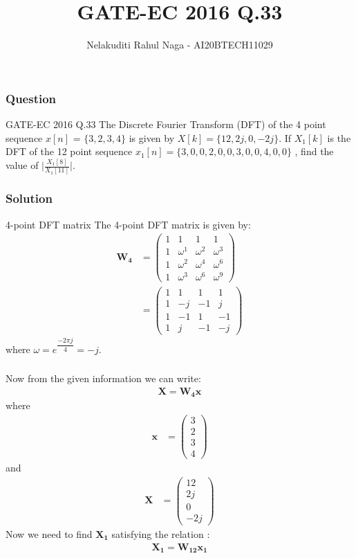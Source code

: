 \documentclass{beamer}
\title{GATE-EC 2016 Q.33}
\author{Nelakuditi Rahul Naga - AI20BTECH11029}
\newcommand{\myvec}[1]{\ensuremath{\begin{pmatrix}#1\end{pmatrix}}}
\renewcommand{\vec}[1]{\mathbf{#1}}
\begin{document}
\begin{frame}
\titlepage
\end{frame}

\begin{frame}
\frametitle{Question}
\begin{block}{GATE-EC 2016 Q.33}
The Discrete Fourier Transform (DFT) of the 4 point sequence $ x[n]$ = $\{3, 2, 3, 4\}$ is given by $ X[k] =\{12, 2j, 0, -2j\}$. If $X_{1}[k]$ is the DFT of the 12 point sequence $ x_{1}[n] =\{3, 0, 0, 2, 0, 0, 3, 0, 0, 4, 0, 0\}$ , find the value of $\big|{\frac{X_{1}[8]}{X_{1}[11]}}\big|$.
\end{block}
\end{frame}

\begin{frame}
\frametitle{Solution}
\begin{block}{4-point DFT matrix}
The 4-point DFT matrix is given by:
\begin{align}
\vec{W_{4}} &=\myvec{
 1  & 1 & 1 & 1 \\
 1 & \omega^1  &\omega^2  &\omega^3  \\
 1 & \omega^2  &\omega^4  &\omega^6  \\
 1 & \omega^3  &\omega^6  &\omega^9 }\\
&=\myvec{
1 &  1 &  1 &  1\\
1 &  -j & -1 & j\\
1 & -1 &  1 & -1\\
1 & j & -1 & -j}
\end{align}
where $\omega = e^{\dfrac{-2 \pi j}{4}} = -j.$
\end{block}
\end{frame}

\begin{frame}
\frametitle{}
Now from the given information we can write:
\begin{align}
\vec{X} = \vec{W_{4}}\vec{x} \label{eq:1}
\end{align}
where
\begin{align}
\vec{x} &=\myvec{3 \\ 2 \\ 3 \\ 4 }
\end{align}
and 
\begin{align}
\vec{X}&=\myvec{12 \\ 2j \\ 0 \\ -2j}  
\end{align}
Now we need to find $\vec{X_{1}}$ satisfying the relation :
\begin{align}
\vec{X_{1}} = \vec{W_{12}}\vec{x_{1}} \label{eq:2}  
\end{align}
\end{frame}
\end{document}
